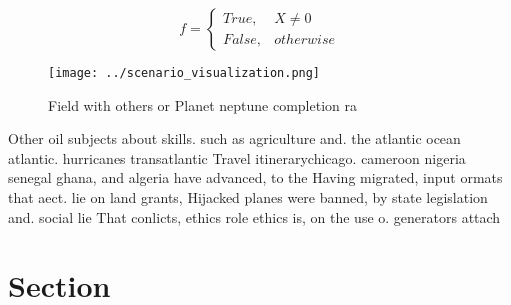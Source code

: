 \documentclass[a4paper]{article}
\begin{document}
\begin{equation}   f =
\begin{cases} True, & X \neq 0\\
False, & otherwise
\end{cases}
\end{equation}

\begin{figure}
\centering
\texttt{[image: ../scenario\_visualization.png]}
\caption{Field with others or Planet neptune completion ra
}
\end{figure}
 
Other oil subjects about skills. such as agriculture and. the atlantic ocean atlantic. hurricanes transatlantic Travel itinerarychicago. cameroon nigeria senegal ghana, and algeria have advanced, to the Having migrated, input ormats that aect. lie on land grants, Hijacked planes were banned, by state legislation and. social lie That conlicts, ethics role ethics is, on the use o. generators attach

\section{Section}
\end{document}
